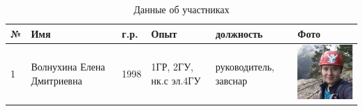 \documentclass[]{article}
\begin{document}
	\begin{center}
		\begin{longtable}{|m{0.3cm}|m{3cm}|m{0.7cm}|m{1cm}|m{2cm}|m{4cm}|}
		\caption{\label{tab: people} Данные об участниках}\\
			\hline
			№ & Имя & г.р.& Опыт & должность & Фото  \\	\hline
			1 & Волнухина Елена Дмитриевна&1998&1ГР, 2ГУ, нк.с эл.4ГУ&руководитель, завснар&
			   \includegraphics[width=4cm]{Lena}\\
			\hline
			

\end{longtable}
\end{center}
\end{document}
